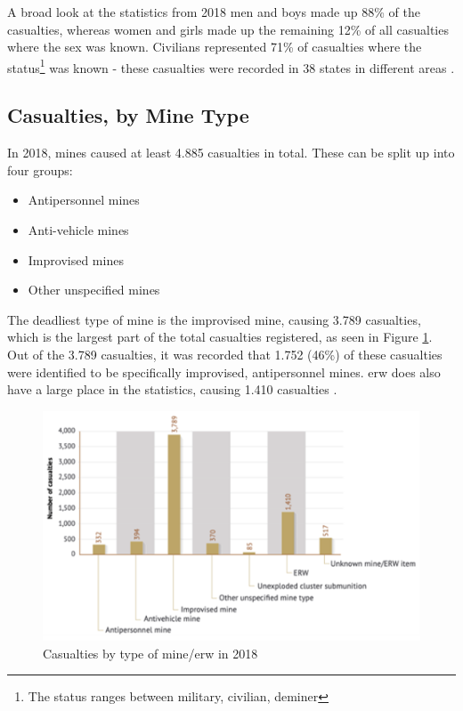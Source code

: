         \vspace{2mm}

A broad look at the statistics from 2018 men and boys made up 88\% of the casualties, whereas women and girls made up the remaining 12\% of all casualties where the sex was known. Civilians represented 71\% of casualties where the status\footnote{The status ranges between military, civilian, deminer} was known - these casualties were recorded in 38 states in different areas \cite{LandmineMonitor2019}.

\subsection{Casualties, by Mine Type}

In 2018, mines caused at least 4.885 casualties in total. These can be split up into four groups: 
\begin{itemize}
    \item Antipersonnel mines
            \vspace{-4mm}
    \item Anti-vehicle mines
            \vspace{-4mm}
    \item Improvised mines
            \vspace{-4mm}
    \item Other unspecified mines
\end{itemize}

The deadliest type of mine is the improvised mine, causing 3.789 casualties, which is the largest part of the total casualties registered, as seen in Figure \ref{fig:casualties_by_type}. Out of the 3.789 casualties, it was recorded that 1.752 (46\%) of these casualties were identified to be specifically improvised, antipersonnel mines. \gls{erw} does also have a large place in the statistics, causing 1.410 casualties \cite{LandmineMonitor2019}.

\begin{figure}[!ht]
  \centering
  \includegraphics[width=12.5cm]{00 - Images/casualties_by_type.png}
  \caption{Casualties by type of mine/\gls{erw} in 2018 \cite{LandmineMonitor2019}}
  \label{fig:casualties_by_type}
\end{figure}